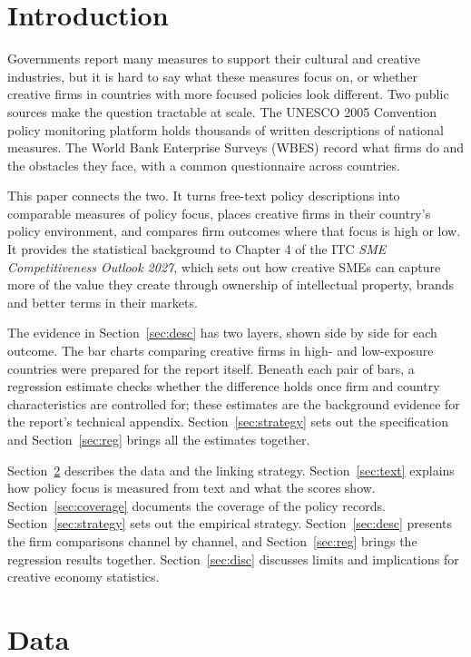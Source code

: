 \documentclass[11pt]{article}
\begin{document}
\section{Introduction}

Governments report many measures to support their cultural and creative industries, but it is hard to say what these measures focus on, or whether creative firms in countries with more focused policies look different. Two public sources make the question tractable at scale. The UNESCO 2005 Convention policy monitoring platform holds thousands of written descriptions of national measures. The World Bank Enterprise Surveys (WBES) record what firms do and the obstacles they face, with a common questionnaire across countries.

This paper connects the two. It turns free-text policy descriptions into comparable measures of policy focus, places creative firms in their country's policy environment, and compares firm outcomes where that focus is high or low. It provides the statistical background to Chapter 4 of the ITC \emph{SME Competitiveness Outlook 2027}, which sets out how creative SMEs can capture more of the value they create through ownership of intellectual property, brands and better terms in their markets.

The evidence in Section~\ref{sec:desc} has two layers, shown side by side for each outcome. The bar charts comparing creative firms in high- and low-exposure countries were prepared for the report itself. Beneath each pair of bars, a regression estimate checks whether the difference holds once firm and country characteristics are controlled for; these estimates are the background evidence for the report's technical appendix. Section~\ref{sec:strategy} sets out the specification and Section~\ref{sec:reg} brings all the estimates together.

Section~\ref{sec:data} describes the data and the linking strategy. Section~\ref{sec:text} explains how policy focus is measured from text and what the scores show. Section~\ref{sec:coverage} documents the coverage of the policy records. Section~\ref{sec:strategy} sets out the empirical strategy. Section~\ref{sec:desc} presents the firm comparisons channel by channel, and Section~\ref{sec:reg} brings the regression results together. Section~\ref{sec:disc} discusses limits and implications for creative economy statistics.

\section{Data}\label{sec:data}
\end{document}
